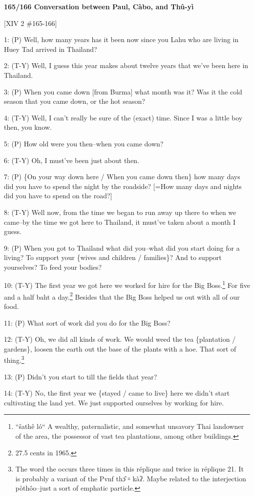 
\textbf{165/166 Conversation between Paul, Càbo, and Thû-yì}

[XIV 2 \#165-166]

1: (P) Well, how many years has it been now since you Lahu who are living in Huey
Tad arrived in Thailand?

2: (T-Y) Well, I guess this year makes about twelve years that we've been here
in Thailand.

3: (P) When you came down [from Burma] what month was it? Was it the cold season
that you came down, or the hot season?

4: (T-Y) Well, I can't really be sure of the (exact) time. Since I was a little
boy then, you know.

5: (P) How old were you then--when you came down?

6: (T-Y) Oh, I must've been just about then.

7: (P) \{On your way down here / When you came down then\} how many days did you
have to spend the night by the roadside? [=How many days and nights did you have
to spend on the road?]

8: (T-Y) Well now, from the time we began to run away up there to when we came--by
the time we got here to Thailand, it must've taken about a month I guess.

9: (P) When you got to Thailand what did you--what did you start doing for a living?
To support your \{wives and children / families\}? And to support yourselves? To
feed your bodies?

10: (T-Y) The first year we got here we worked for hire for the Big Boss.\footnote{``šathê ló`` A wealthy, paternalistic, and somewhat unsavory Thai landowner of the area, the possessor of vast tea plantations, among other buildings.} For
five and a half baht a day.\footnote{27.5 cents in 1965.} Besides that the Big Boss helped us out with all
of our food.

11: (P) What sort of work did you do for the Big Boss?

12: (T-Y) Oh, we did all kinds of work. We would weed the tea \{plantation / gardens\},
loosen the earth out the base of the plants with a hoe. That sort of thing.\footnote{The word the occurs three times in this réplique and twice in réplique 21. It is probably a variant of the Pvnf thɔ̂ ꞊ kàʔ. Maybe related to the interjection pòthôo--just a sort of emphatic particle.}

13: (P) Didn't you start to till the fields that year?

14: (T-Y) No, the first year we \{stayed / came to live\} here we didn't start
cultivating the land yet. We just supported ourselves by working for hire.

